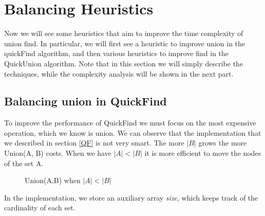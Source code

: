 \documentclass{article}
\begin{document}
\section{Balancing Heuristics}
Now we will see some heuristics that aim to improve the time complexity of union find. In particular,
we will first see a heuristic to improve union in the quickFind algorithm, and then various heuristics to improve
find in the QuickUnion algorithm. Note that in this section we will simply describe the techniques, while the 
complexity analysis will be shown in the next part.
\subsection{Balancing union in QuickFind}
To improve the performance of QuickFind we must focus on the most expensive operation, which we know is 
union. We can observe that the implementation that we described in section \ref{QF} is not very smart. The more $ | B | $ grows the more
Union(A, B) costs. When we have $|A| < |B| $ it is more efficient to move the nodes of the set A.

\begin{figure}[h!]
    \centering
    \caption{Union(A,B) when $|A| < |B|$}
    \label{fig:qfsize}
\end{figure}
In the implementation, we store an auxiliary array \emph{size}, which keeps track
of the cardinality of each set.
\end{document}
